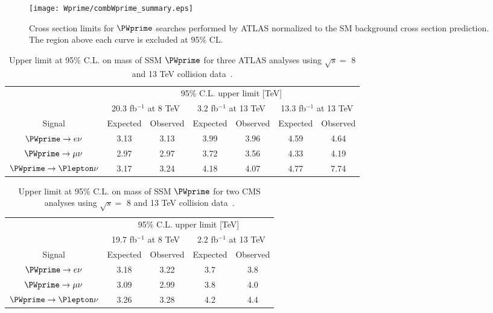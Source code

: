 \begin{figure}[]
 \texttt{[image: Wprime/combWprime\_summary.eps]}
  \caption{
Cross section limits for $\PWprime$ searches performed by ATLAS
normalized to the SM background cross section prediction.
The region above each curve is excluded at 95\% CL.
}
  \label{fig:Wprime_allResults}
\end{figure}


\begin{table*}[]
\begin{center}
\begin{tabular}{c||c|c||c|c||c|c}
 & \multicolumn{6}{c}{95\%  C.L. upper limit [TeV]} \\
 & \multicolumn{2}{c||}{20.3 fb$^{-1}$ at 8 TeV} & \multicolumn{2}{c||}{3.2 fb$^{-1}$ at 13 TeV} & \multicolumn{2}{c}{13.3 fb$^{-1}$ at 13 TeV} \\
 \hline
Signal & Expected & Observed & Expected & Observed & Expected & Observed \\
\hline
\rule{0pt}{3ex}
$\PWprime \to e\nu$ & 3.13 & 3.13 & 3.99 & 3.96 & 4.59 & 4.64 \\
\hline
$\PWprime \to \mu\nu$ & 2.97 & 2.97 & 3.72 & 3.56 & 4.33 & 4.19 \\
\hline
$\PWprime \to \Plepton\nu$ & 3.17 & 3.24 & 4.18 & 4.07 & 4.77 & 7.74 \\
\end{tabular}
\end{center}
 \caption{Upper limit at 95\% C.L. on mass of SSM $\PWprime$ for three ATLAS analyses using $\sqrt{s} =$ 8 and 13 TeV \pp collision data~\cite{wprime_8TeV,Aaboud:2016zkn,wprime_atlas_13TeV_13fb}.}
\label{tab:Wprime_limit_vs_years_ATLAS}
\end{table*}


\begin{table*}[]
\begin{center}
\begin{tabular}{c||c|c||c|c}
 & \multicolumn{4}{c}{95\%  C.L. upper limit [TeV]} \\
 & \multicolumn{2}{c||}{19.7 fb$^{-1}$ at 8 TeV} & \multicolumn{2}{c}{2.2 fb$^{-1}$ at 13 TeV}  \\
 \hline
Signal & Expected & Observed & Expected & Observed  \\
\hline
\rule{0pt}{3ex}
$\PWprime \to e\nu$ & 3.18 & 3.22 & 3.7 & 3.8 \\
\hline
$\PWprime \to \mu\nu$ & 3.09 & 2.99 & 3.8 & 4.0 \\
\hline
$\PWprime \to \Plepton\nu$ & 3.26 & 3.28 & 4.2 & 4.4 \\
\end{tabular}
\end{center}
 \caption{Upper limit at 95\% C.L. on mass of SSM $\PWprime$ for two CMS analyses using $\sqrt{s} =$ 8 and 13 TeV \pp collision data~\cite{wprime_cms_8TeV,wprime_cms_13TeV}.}
\label{tab:Wprime_limit_vs_years_CMS}
\end{table*}

